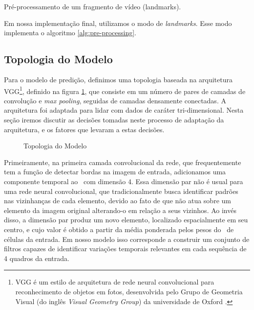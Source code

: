 \begin{algorithm}[H]
    \SetAlgoLined
    \caption{Pré-processamento de um fragmento de vídeo (landmarks).}
    \label{alg:pre-processing}
\end{algorithm}

Em nossa implementação final, utilizamos o modo de \textit{landmarks}. Esse modo implementa o algoritmo \ref{alg:pre-processing}.

\subsection{Topologia do Modelo}
\label{sec:topology}

Para o modelo de predição, definimos uma topologia baseada na arquitetura VGG\footnote{VGG é um estilo de arquitetura de rede neural convolucional para reconhecimento de objetos em fotos, desenvolvida pelo Grupo de Geometria Visual (do inglês \textit{Visual Geometry Group}) da universidade de Oxford \cite{simonyanVeryDeepConvolutional2015}.}, definido na figura \ref{fig:topology_typeA}, que consiste em um número de pares de camadas de convolução e \textit{max pooling}, seguidas de camadas densamente conectadas.
A arquitetura foi adaptada para lidar com dados de caráter tri-dimensional.
Nesta seção iremos discutir as decisões tomadas neste processo de adaptação da arquitetura, e os fatores que levaram a estas decisões.

\begin{figure}[ht]
    \centering
    \resizebox{!}{0.7\textheight}{
        
        }
    \caption{Topologia do Modelo}
    \label{fig:topology_typeA}
\end{figure}

Primeiramente, na primeira camada convolucional da rede, que frequentemente tem a função de detectar bordas na imagem de entrada, adicionamos uma componente temporal ao \ com dimensão 4.
Essa dimensão par não é usual para uma rede neural convolucional, que tradicionalmente busca identificar padrões nas vizinhanças de cada elemento, devido ao fato de que não atua sobre um elemento da imagem original alterando-o em relação a seus vizinhos.
Ao invés disso, a dimensão par produz um novo elemento, localizado espacialmente em seu centro, e cujo valor é obtido a partir da média ponderada pelos pesos do \ de células da entrada.
Em nosso modelo isso corresponde a construir um conjunto de filtros capazes de identificar variações temporais relevantes em cada sequência de 4 quadros da entrada.

